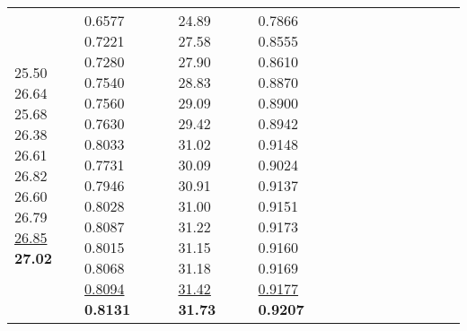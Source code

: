 \documentclass[runningheads]{llncs}
\begin{document}
\begin{table}[!ht]
\begin{tabular}{|p{7em}|p{2.5em}|p{2.5em}|p{3em}|p{2.5em}|p{3em}|p{2.5em}|p{3em}|p{2.5em}|p{3em}|p{2.5em}|p{3em}|}
 \newline{}25.50 \newline{}26.64 \newline{}25.68 \newline{}26.38 \newline{}26.61 \newline{}26.82 \newline{}26.60 \newline{}26.79 \newline{}\underline{26.85} \newline{}\bfseries{27.02} & 0.6577 \newline{}0.7221 \newline{}0.7280 \newline{}0.7540 \newline{}0.7560 \newline{}0.7630 \newline{}0.8033 \newline{}0.7731 \newline{}0.7946 \newline{}0.8028 \newline{}0.8087 \newline{}0.8015 \newline{}0.8068 \newline{}\underline{0.8094} \newline{}\bfseries{0.8131} & 24.89 \newline{}27.58 \newline{}27.90 \newline{}28.83 \newline{}29.09 \newline{}29.42 \newline{}31.02 \newline{}30.09 \newline{}30.91 \newline{}31.00 \newline{}31.22 \newline{}31.15 \newline{}31.18 \newline{}\underline{31.42} \newline{}\bfseries{31.73} & 0.7866\newline{} 0.8555\newline{} 0.8610\newline{} 0.8870\newline{} 0.8900\newline{} 0.8942\newline{} 0.9148\newline{} 0.9024\newline{} 0.9137\newline{} 0.9151\newline{} 0.9173 \newline{}0.9160 \newline{}0.9169 \newline{}\underline{0.9177} \newline{}\bfseries{0.9207} \\

\end{tabular}
\end{table}
\end{document}
